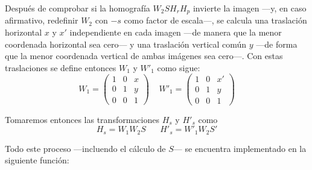 \documentclass[a4paper, 11pt]{article}
\theoremstyle{definition}
\begin{document}
    Después de comprobar si la homografía $W_2 S H_r H_p$ invierte la imagen ---y, en caso afirmativo, redefinir $W_2$ con $-s$ como factor de escala---, se calcula una traslación horizontal $x$ y $x'$ independiente en cada imagen ---de manera que la menor coordenada horizontal sea cero--- y una traslación vertical común $y$ ---de forma que la menor coordenada vertical de ambas imágenes sea cero---. Con estas traslaciones se define entonces $W_1$ y $W'_1$ como sigue:
    \[
    W_1 = \begin{pmatrix}
        1 & 0 & x \\
        0 & 1 & y \\
        0 & 0 & 1
    \end{pmatrix}\;\;\;\;
    W'_1 = \begin{pmatrix}
        1 & 0 & x' \\
        0 & 1 & y \\
        0 & 0 & 1
    \end{pmatrix}
    \]

    Tomaremos entonces las transformaciones $H_s$ y $H'_s$ como
    \[
    H_s = W_1 W_2 S\;\;\;\;\;\;
    H'_s = W'_1 W_2 S'
    \]

    Todo este proceso ---incluendo el cálculo de $S$--- se encuentra implementado en la siguiente función:
\end{document}
